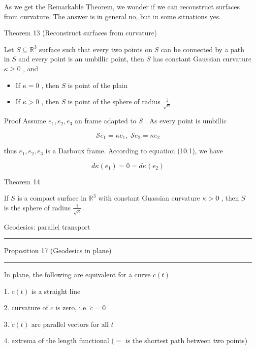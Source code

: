 \documentclass[lang=cn,a4paper,11pt,openany,twoside]{elegantbook}
\newcommand{\HRule}{\begin{center}\rule{0.9\linewidth}{0.2mm}\end{center}}
\begin{document}
As we get the Remarkable Theorem, we wonder if we can reconstruct surfaces from curvature. The answer is in general no, but in some situations yes.

Theorem 13 (Reconstruct surfaces from curvature)

Let \(S \subseteq  {\mathbb{R}}^{3}\) surface such that every two points on \(S\) can be connected by a path in \(S\) and every point is an umbillic point, then \(S\) has constant Gaussian curvature \(\kappa  \geq  0\) , and

\begin{itemize}\relax
\item\relax If \(\kappa  = 0\) , then \(S\) is point of the plain
\end{itemize}

\begin{itemize}\relax
\item\relax If \(\kappa  > 0\) , then \(S\) is point of the sphere of radius \(\frac{1}{\sqrt{\kappa }}\)
\end{itemize}

Proof Assume \({e}_{1},{e}_{2},{e}_{3}\) an frame adapted to \(S\) . As every point is umbillic

\[
\mathcal{S}{e}_{1} = \kappa {e}_{1},\;\mathcal{S}{e}_{2} = \kappa {e}_{2}
\]

thus \({e}_{1},{e}_{2},{e}_{3}\) is a Darboux frame. According to equation (10.1), we have

\[
{d\kappa }\left( {e}_{1}\right)  = 0 = {d\kappa }\left( {e}_{2}\right)
\]

Theorem 14

If \(S\) is a compact surface in \({\mathbb{R}}^{3}\) with constant Guassian curvature \(\kappa  > 0\) , then \(S\) is the sphere of radius \(\frac{1}{\sqrt{\kappa }}\) .

Geodesics: parallel transport

\HRule

Proposition 17 (Geodesics in plane)

\HRule

In plane, the following are equivalent for a curve \(c\left( t\right)\)

1. \(c\left( t\right)\) is a straight line

2. curvature of \(c\) is zero, i.e. \(\ddot{c} = 0\)

3. \(\dot{c}\left( t\right)\) are parallel vectors for all \(t\)

4. extrema of the length functional \(( =\) is the shortest path between two points)
\end{document}
